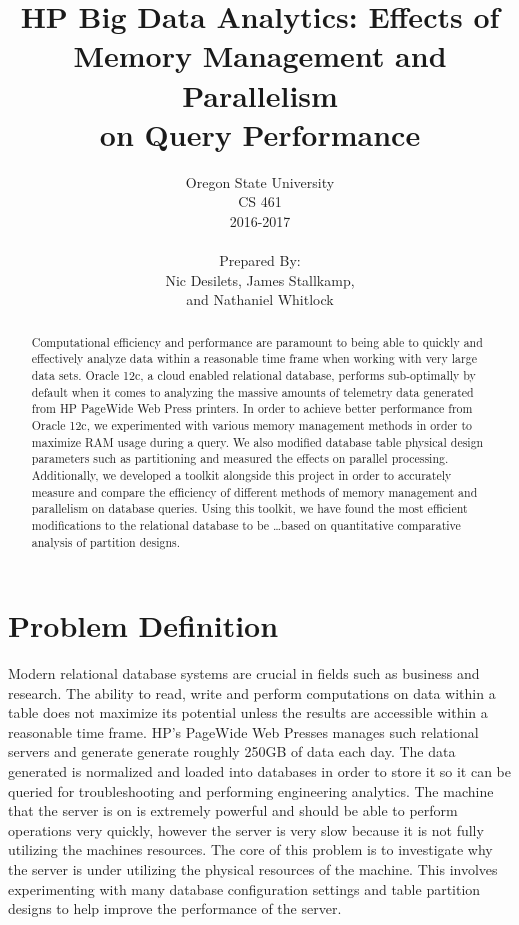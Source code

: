 \documentclass[draftclsnofoot, onecolumn, 10pt]{IEEEtran}
\title{\huge HP Big Data Analytics: Effects of\\Memory Management and Parallelism\\on Query Performance}
\author{Oregon State University\\CS 461\\2016-2017\\\\Prepared By:\\Nic Desilets, James Stallkamp,\\and Nathaniel Whitlock}
\begin{document}
\begin{titlingpage}
    \maketitle
    
    \begin{abstract}
		Computational efficiency and performance are paramount to being able to quickly and effectively analyze data within a reasonable time frame when working with very large data sets. 
		Oracle 12c, a cloud enabled relational database, performs sub-optimally by default when it comes to analyzing the massive amounts of telemetry data generated from HP PageWide Web Press printers.
		In order to achieve better performance from Oracle 12c, we experimented with various memory management methods in order to maximize RAM usage during a query.
		We also modified database table physical design parameters such as partitioning and measured the effects on parallel processing.
		Additionally, we developed a toolkit alongside this project in order to accurately measure and compare the efficiency of different methods of memory management and parallelism on database queries.
		Using this toolkit, we have found the most efficient modifications to the relational database to be \ldots based on quantitative comparative analysis of partition designs.
    \end{abstract}
\end{titlingpage}


\section*{Problem Definition}
Modern relational database systems are crucial in fields such as business and research.
The ability to read, write and perform computations on data within a table does not maximize its potential unless the results are accessible within a reasonable time frame.
HP’s PageWide Web Presses manages such relational servers and generate generate roughly 250GB of data each day.
The data generated is normalized and loaded into databases in order to store it so it can be queried for troubleshooting and performing engineering analytics.
The machine that the server is on is extremely powerful and should be able to perform operations very quickly, however the server is very slow because it is not fully utilizing the machines resources.
The core of this problem is to investigate why the server is under utilizing the physical resources of the machine.
This involves experimenting with many database configuration settings and table partition designs to help improve the performance of the server. 
\end{document}
